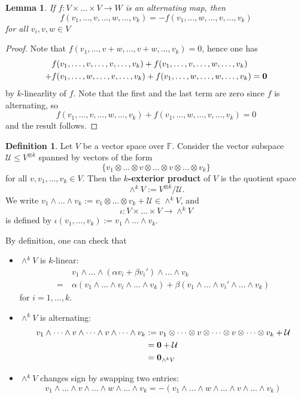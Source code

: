 \documentclass[11pt,openany]{book}
\theoremstyle{plain}
\newtheorem{lemma}[lemma]{Lemma}
\theoremstyle{definition}
\newtheorem{definition}[definition]{Definition}
\theoremstyle{remark}
\begin{document}
\begin{lemma}
    If $f:V \times \dots \times V \to W$ is an alternating map, then
    $$f(v_1, \dots , v , \dots , w , \dots , v_k) = - f(v_1, \dots , w , \dots , v , \dots , v_k)$$
    for all $v_i, v, w \in V$
\end{lemma}
\begin{proof}
    Note that $f(v_1, \dots, v+w, \dots, v+w, \dots, v_k) = 0$, hence one has
\begin{align*}
&f(v_1, \dots, v, \dots, v, \dots, v_k) + f(v_1, \dots, v, \dots, w, \dots, v_k) \\
+ &f(v_1, \dots, w, \dots, v, \dots, v_k) + f(v_1, \dots, w, \dots, w, \dots, v_k) = {\bf 0}    
\end{align*}
by $k$-linearlity of $f$. Note that the first and the last term are zero since $f$ is alternating, so
$$f(v_1, \dots, v, \dots, w, \dots, v_k) + f(v_1, \dots, w, \dots, v, \dots, v_k) = 0$$    
and the result follows.
\end{proof}

\begin{definition}
Let $V$ be a vector space over $\mathbb{F}$. Consider the vector subspace $\mathcal{U} \leq V^{\otimes k}$ spanned by vectors of the form
$$\{v_1  \otimes  \dots \otimes v \otimes \dots \otimes v \otimes \dots \otimes  v_k\}$$
for all $v, v_1, \dots, v_k \in V$. Then the {\bf $k$-exterior product} of $V$ is the quotient space
$$\wedge^k V := V^{\otimes k}/\mathcal{U}.$$
We write $v_1 \wedge \dots \wedge v_k := v_1 \otimes \dots \otimes v_k + \mathcal{U} \in \wedge^k V$, and 
$$\iota: V \times \dots \times V \to \wedge^k V$$
is defined by $\iota(v_1, \dots, v_k) := v_1 \wedge \dots \wedge v_k$.
\end{definition}

By definition, one can check that 
\begin{itemize}
    \item $\wedge^k V$ is $k$-linear:
    \begin{align*}
&v_1  \wedge  \dots  \wedge (\alpha v_i + \beta v_i' )  \wedge  \dots  \wedge v_k \\
=\ &\alpha(v_1  \wedge  \dots  \wedge v_i  \wedge  \dots  \wedge v_k) + \beta(v_1  \wedge  \dots  \wedge v_i'  \wedge  \dots  \wedge v_k)\end{align*}
for $i = 1, \dots, k.$
\item $\wedge^k V$ is alternating:
\begin{align*}
v_1  \wedge  \dots  \wedge v  \wedge  \dots  \wedge v  \wedge  \dots  \wedge v_k &:= v_1 \otimes  \dots \otimes v \otimes  \dots \otimes v \otimes  \dots \otimes v_k +\mathcal{U} \\
&= {\bf 0} + \mathcal{U}\\
&= {\bf 0}_{\wedge^k V}
\end{align*}
\item $\wedge^k V$ changes sign by swapping two entries:
$$v_1 \wedge  \dots \wedge v \wedge  \dots \wedge w \wedge  \dots \wedge v_k =-(v_1 \wedge  \dots \wedge w \wedge  \dots \wedge v \wedge  \dots \wedge v_k)$$
\end{itemize}
\end{document}
